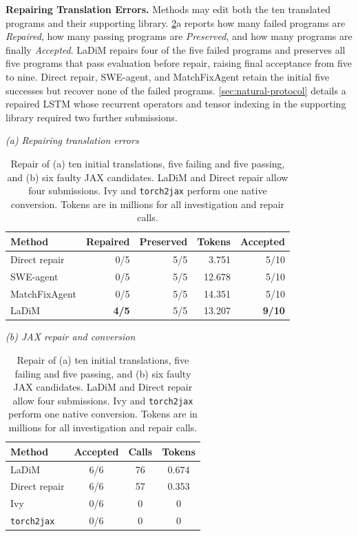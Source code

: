 \documentclass{article}
\begin{document}
\textbf{Repairing Translation Errors.} Methods may edit both the ten translated programs and their supporting library. \cref{tab:repair-results}a reports how many failed programs are \emph{Repaired}, how many passing programs are \emph{Preserved}, and how many programs are finally \emph{Accepted}. LaDiM repairs four of the five failed programs and preserves all five programs that pass evaluation before repair, raising final acceptance from five to nine. Direct repair, SWE-agent, and MatchFixAgent retain the initial five successes but recover none of the failed programs. \cref{sec:natural-protocol} details a repaired LSTM whose recurrent operators and tensor indexing in the supporting library required two further submissions.
\begin{table}[t]
\caption{Repair of (a) ten initial translations, five failing and five passing, and (b) six faulty JAX candidates. LaDiM and Direct repair allow four submissions. Ivy and \texttt{torch2jax} perform one native conversion. Tokens are in millions for all investigation and repair calls.}
\label{tab:repair-results}
\centering
\small
\setlength{\tabcolsep}{2pt}
\begin{minipage}[t]{0.555\linewidth}
\vspace{0pt}
{\raggedright\textit{(a) Repairing translation errors}\par}\smallskip

\begin{tabular*}{\linewidth}{@{\extracolsep{\fill}}lrrrr@{}}
\toprule
\textbf{Method} & \textbf{Repaired} & \textbf{Preserved} & \textbf{Tokens} & \textbf{Accepted} \\
\midrule
Direct repair & 0/5 & 5/5 & 3.751 & 5/10 \\
SWE-agent & 0/5 & 5/5 & 12.678 & 5/10 \\
MatchFixAgent & 0/5 & 5/5 & 14.351 & 5/10 \\
LaDiM & \textbf{4/5} & 5/5 & 13.207 & \textbf{9/10} \\
\bottomrule
\end{tabular*}


\end{minipage}\hfill
\begin{minipage}[t]{0.415\linewidth}
\vspace{0pt}
{\raggedright\textit{(b) JAX repair and conversion}\par}\smallskip
\begin{tabular*}{\linewidth}{@{\extracolsep{\fill}}lccc@{}}
\toprule
\textbf{Method} & \textbf{Accepted} & \textbf{Calls} & \textbf{Tokens} \\
\midrule
LaDiM         & 6/6 & 76 & 0.674 \\
Direct repair & 6/6 & 57 & 0.353 \\
Ivy                & 0/6 & 0 & 0 \\
\texttt{torch2jax} & 0/6 & 0 & 0 \\
\bottomrule
\end{tabular*}
\end{minipage}
\vspace{-12pt}
\end{table}
\end{document}
